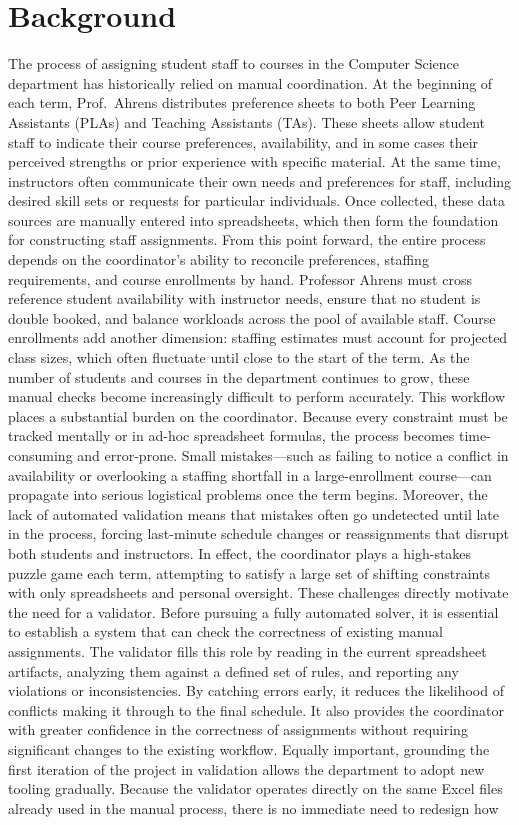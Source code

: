 \section{Background}
The process of assigning student staff to courses in the Computer Science department has historically relied on manual coordination. At the beginning of each term, Prof.~Ahrens distributes preference sheets to both Peer Learning Assistants (PLAs) and Teaching Assistants (TAs). These sheets allow student staff to indicate their course preferences, availability, and in some cases their perceived strengths or prior experience with specific material. At the same time, instructors often communicate their own needs and preferences for staff, including desired skill sets or requests for particular individuals. Once collected, these data sources are manually entered into spreadsheets, which then form the foundation for constructing staff assignments. From this point forward, the entire process depends on the coordinator’s ability to reconcile preferences, staffing requirements, and course enrollments by hand. Professor Ahrens must cross reference student availability with instructor needs, ensure that no student is double booked, and balance workloads across the pool of available staff. Course enrollments add another dimension: staffing estimates must account for projected class sizes, which often fluctuate until close to the start of the term. As the number of students and courses in the department continues to grow, these manual checks become increasingly difficult to perform accurately. This workflow places a substantial burden on the coordinator. Because every constraint must be tracked mentally or in ad-hoc spreadsheet formulas, the process becomes time-consuming and error-prone. Small mistakes—such as failing to notice a conflict in availability or overlooking a staffing shortfall in a large-enrollment course—can propagate into serious logistical problems once the term begins. Moreover, the lack of automated validation means that mistakes often go undetected until late in the process, forcing last-minute schedule changes or reassignments that disrupt both students and instructors. In effect, the coordinator plays a high-stakes puzzle game each term, attempting to satisfy a large set of shifting constraints with only spreadsheets and personal oversight. These challenges directly motivate the need for a validator. Before pursuing a fully automated solver, it is essential to establish a system that can check the correctness of existing manual assignments. The validator fills this role by reading in the current spreadsheet artifacts, analyzing them against a defined set of rules, and reporting any violations or inconsistencies. By catching errors early, it reduces the likelihood of conflicts making it through to the final schedule. It also provides the coordinator with greater confidence in the correctness of assignments without requiring significant changes to the existing workflow. Equally important, grounding the first iteration of the project in validation allows the department to adopt new tooling gradually. Because the validator operates directly on the same Excel files already used in the manual process, there is no immediate need to redesign how 